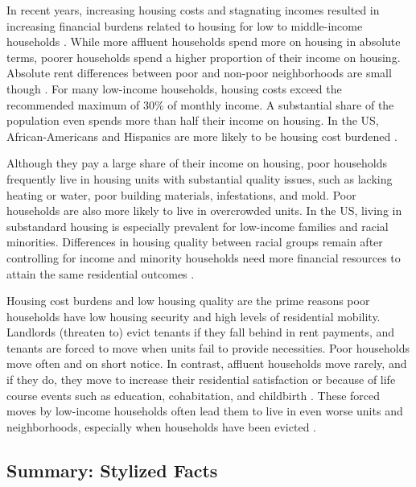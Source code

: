 In recent years, increasing housing costs and stagnating incomes resulted in increasing financial burdens related to housing for low to middle-income households \citep{delucaHousingInsecurityPoor2022}. While more affluent households spend more on housing in absolute terms, poorer households spend a higher proportion of their income on housing. Absolute rent differences between poor and non-poor neighborhoods are small though \citep{desmondPoorPayMore2019}. For many low-income households, housing costs exceed the recommended maximum of 30\% of monthly income. A substantial share of the population even spends more than half their income on housing. In the US, African-Americans and Hispanics are more likely to be housing cost burdened \citep{delucaHousingInsecurityPoor2022}. 

Although they pay a large share of their income on housing, poor households frequently live in housing units with substantial quality issues, such as lacking heating or water, poor building materials, infestations, and mold. Poor households are also more likely to live in overcrowded units. In the US, living in substandard housing is especially prevalent for low-income families and racial minorities. Differences in housing quality between racial groups remain after controlling for income and minority households need more financial resources to attain the same residential outcomes \citep{crowderInterneighborhoodMigrationRace2010, pendallWhyHighPovertyNeighborhoods2016, delucaHousingInsecurityPoor2022}. 

Housing cost burdens and low housing quality are the prime reasons poor households have low housing security and high levels of residential mobility. Landlords (threaten to) evict tenants if they fall behind in rent payments, and tenants are forced to move when units fail to provide necessities. Poor households move often and on short notice. In contrast, affluent households move rarely, and if they do, they move to increase their residential satisfaction or because of life course events such as education, cohabitation, and childbirth \citep{bruchChoiceSetFormation2019, delucaNotJustLateral2020, delucaHousingInsecurityPoor2022}. These forced moves by low-income households often lead them to live in even worse units and neighborhoods, especially when households have been evicted \citep{desmondEvictedPovertyProfit2017, delucaHousingInsecurityPoor2022}. 


\subsection{Summary: Stylized Facts}

